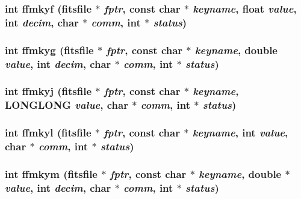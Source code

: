 \subsubsection{\setlength{\rightskip}{0pt plus 5cm}int ffmkyf (\bf{fitsfile} $\ast$ {\em fptr}, const char $\ast$ {\em keyname}, float {\em value}, int {\em decim}, char $\ast$ {\em comm}, int $\ast$ {\em status})}\label{test_2shm__client_2fitsio_8h_a6e96904c21b62c82a78f38a345e7b39}


\subsubsection{\setlength{\rightskip}{0pt plus 5cm}int ffmkyg (\bf{fitsfile} $\ast$ {\em fptr}, const char $\ast$ {\em keyname}, double {\em value}, int {\em decim}, char $\ast$ {\em comm}, int $\ast$ {\em status})}\label{test_2shm__client_2fitsio_8h_cfca16506886068b451f7a977934509b}


\subsubsection{\setlength{\rightskip}{0pt plus 5cm}int ffmkyj (\bf{fitsfile} $\ast$ {\em fptr}, const char $\ast$ {\em keyname}, \bf{LONGLONG} {\em value}, char $\ast$ {\em comm}, int $\ast$ {\em status})}\label{test_2shm__client_2fitsio_8h_9337d5f08bcd5c82afc87256596ded23}


\subsubsection{\setlength{\rightskip}{0pt plus 5cm}int ffmkyl (\bf{fitsfile} $\ast$ {\em fptr}, const char $\ast$ {\em keyname}, int {\em value}, char $\ast$ {\em comm}, int $\ast$ {\em status})}\label{test_2shm__client_2fitsio_8h_b0edcf1260c7df986e19da627da36ee1}


\subsubsection{\setlength{\rightskip}{0pt plus 5cm}int ffmkym (\bf{fitsfile} $\ast$ {\em fptr}, const char $\ast$ {\em keyname}, double $\ast$ {\em value}, int {\em decim}, char $\ast$ {\em comm}, int $\ast$ {\em status})}\label{test_2shm__client_2fitsio_8h_2e1ce1cd4c5dec3d5966edd8febeb9c0}


